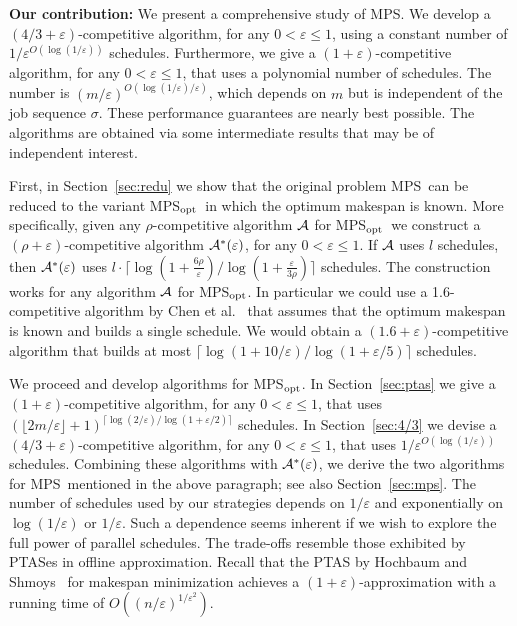 \documentclass{llncs}
\newcommand{\MPS}{{\rm MPS}}
\newcommand{\MPSO}{{\rm MPS$_{\rm opt}$}}
\newcommand{\eps}{\varepsilon}
\begin{document}
\vspace*{0.1cm}
{\bf Our contribution:}
We present a comprehensive study of \MPS. We develop a $(4/3+\eps)$-competitive algorithm, for any
$0<\eps\leq 1$, using a constant number of $1/\eps^{O(\log (1/\eps))}$ schedules.
Furthermore, we give a $(1+\eps)$-competitive algorithm, for any $0<\eps\leq 1$, that uses a 
polynomial number of schedules. The number is $(m/\eps)^{O(\log (1/\eps) / \eps)}$, which
depends on $m$ but is independent of the job sequence $\sigma$. These performance guarantees are nearly 
best possible. The algorithms are obtained via some intermediate results that may be of 
independent interest.

First, in Section~\ref{sec:redu} we show that the original problem \MPS\ can be reduced to the variant
\MPSO\ in which the optimum makespan is known. More specifically, given any
$\rho$-competitive algorithm ${\cal A}$ for \MPSO\ we construct a $(\rho+\eps)$-competitive algorithm
${\cal A}^*(\eps)$, for any $0< \eps \leq 1$. If ${\cal A}$ uses $l$ schedules, then ${\cal A}^*(\eps)$
uses $l \cdot \lceil \log (1+ \frac{6\rho}{\eps}) / \log(1+\frac{\eps}{3\rho})\rceil$ schedules. 
The construction works for any algorithm ${\cal A}$ for \MPSO. In particular we could use a 1.6-competitive
algorithm by Chen et al.~\cite{CKK} that assumes that the optimum makespan is known and builds
a single schedule. We would obtain a $(1.6+\eps)$-competitive algorithm that builds at most 
$\lceil \log (1+ 10/\eps) / \log(1+\eps/5)\rceil$ schedules.

We proceed and develop algorithms for \MPSO. In Section~\ref{sec:ptas} we give a $(1+\eps)$-competitive
algorithm, for any $0<\eps\leq 1$, that uses 
$(\lfloor 2m/\eps\rfloor +1)^{\lceil \log(2/\eps) / \log(1+\eps/2) \rceil }$ schedules. In Section~\ref{sec:4/3}
we devise a $(4/3+\eps)$-competitive algorithm, for any $0<\eps\leq 1$, that uses 
$1/\eps^{O(\log (1/\eps))}$ schedules. Combining these algorithms with ${\cal A}^*(\eps)$, we
derive the two algorithms for \MPS\ mentioned in the above paragraph; see also Section~\ref{sec:mps}.
The number of schedules used by our strategies depends on $1/\eps$ and exponentially on 
$\log (1/\eps)$ or $1/\eps$. Such a dependence seems inherent if we wish to explore the full power
of parallel schedules. The trade-offs resemble those exhibited by PTASes in offline approximation.
Recall that the PTAS by Hochbaum and Shmoys~\cite{HS} for makespan minimization achieves
a $(1+\eps)$-approximation with a running time of $O((n/\eps)^{1/\eps^2})$.
\end{document}
